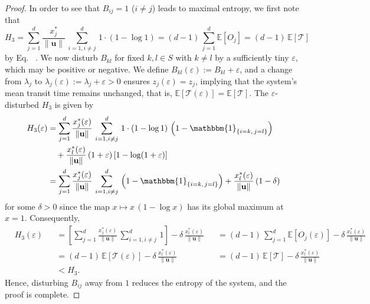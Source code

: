 \documentclass[smallextended]{svjour3}
\makeatletter
\renewcommand*{\eqref}[1]{%
  \hyperref[{#1}]{\textup{\tagform@{\ref*{#1}}}}%
}
\renewcommand{\vec}[1]{\mathbf{#1}}
\newcommand{\E}{\mathbb{E}}
\newcommand{\TT}{\mathcal{T}}
\newcommand{\suml}{\sum\limits}
\newcommand{\vnorms}[1]{\|#1\|}
\newcommand{\ie}{that is}
\makeatother
\begin{document}
\begin{proof}
		In order to see that $B_{ij}=1$ ($i\neq j$) leads to maximal entropy, we first note that 
		\begin{equation}
			H_3 = \suml_{j=1}^d \frac{x^\ast_j}{\vnorms{\vec{u}}}\,\suml_{i=1,i\neq j}^d \,1\cdot(1-\log 1) = (d-1)\,\suml_{j=1}^d \E\left[O_j\right] = (d-1)\,\E\left[\TT\right]
		\end{equation}
		by Eq.~\eqref{eqn:H_occupation_time}.
		We now disturb $B_{kl}$ for fixed $k,l\in S$ with $k\neq l$ by a sufficiently tiny $\varepsilon$, which may be positive or negative.
		We define $B_{kl}(\varepsilon):=B_{kl}+\varepsilon$, and a change from $\lambda_j$ to $\lambda_j(\varepsilon):=\lambda_j+\varepsilon>0$ ensures $z_j(\varepsilon) = z_j$, implying that the system's mean transit time remains unchanged, \ie, $\E\left[\TT(\varepsilon)\right] = \E\left[\TT\right]$.
		The $\varepsilon$-disturbed $H_3$ is given by
		\begin{equation}
      \begin{aligned}
        H_3(\varepsilon) &= \suml_{j=1}^d \frac{x^\ast_j(\varepsilon)}{\vnorms{\vec{u}}}\,\suml_{i=1,i\neq j}^d \,1\cdot(1-\log 1)\,\left(1-\mathbbm{1}_{\{i=k,\,j=l\}}\right)\\
        &\quad + \frac{x^\ast_l(\varepsilon)}{\vnorms{\vec{u}}}\,(1+\varepsilon)\,[1-\log(1+\varepsilon)]\\
        &= \suml_{j=1}^d \frac{x^\ast_j(\varepsilon)}{\vnorms{\vec{u}}}\,\suml_{i=1,i\neq j}^d \,\left(1-\mathbbm{1}_{\{i=k,\,j=l\}}\right) + \frac{x^\ast_l(\varepsilon)}{\vnorms{\vec{u}}}\,(1-\delta)\\
      \end{aligned}
    \end{equation}
		for some $\delta>0$ since the map $x\mapsto x\,(1-\log x)$ has its global maximum at $x=1$.
		Consequently,
		\begin{equation}
		\begin{aligned}
			&H_3(\varepsilon) &&= \left[\suml_{j=1}^d \frac{x^\ast_j(\varepsilon)}{\vnorms{\vec{u}}}\,\suml_{i=1,i\neq j}^d \,1\right] - \delta\,\frac{x^\ast_l(\varepsilon)}{\vnorms{\vec{u}}}
			&&= (d-1)\,\suml_{j=1}^d \E\left[O_j(\varepsilon)\right] - \delta\,\frac{x^\ast_l(\varepsilon)}{\vnorms{\vec{u}}}\\
			& &&= (d-1)\,\E\left[\TT(\varepsilon)\right] - \delta\,\frac{x^\ast_l(\varepsilon)}{\vnorms{\vec{u}}}
			&&= (d-1)\,\E\left[\TT\right] - \delta\,\frac{x^\ast_l(\varepsilon)}{\vnorms{\vec{u}}}\\
			& && < H_3.
		\end{aligned}
	\end{equation}
		Hence, disturbing $B_{ij}$ away from $1$ reduces the entropy of the system, and the proof is complete.
	\end{proof}
	
\end{document}
